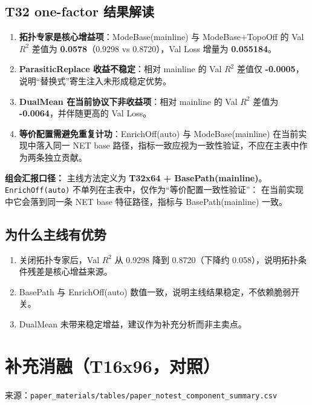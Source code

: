 \documentclass[12pt,a4paper]{ctexart}
\begin{document}
\subsection{T32 one-factor 结果解读}
\begin{enumerate}
  \item \textbf{拓扑专家是核心增益项}：ModeBase(mainline) 与 ModeBase+TopoOff 的 Val $R^2$ 差值为 \textbf{0.0578}（0.9298 vs 0.8720），Val Loss 增量为 \textbf{0.055184}。
  \item \textbf{ParasiticReplace 收益不稳定}：相对 mainline 的 Val $R^2$ 差值仅 \textbf{-0.0005}，说明“替换式”寄生注入未形成稳定优势。
  \item \textbf{DualMean 在当前协议下非收益项}：相对 mainline 的 Val $R^2$ 差值为 \textbf{-0.0064}，并伴随更高的 Val Loss。
  \item \textbf{等价配置需避免重复计功}：EnrichOff(auto) 与 ModeBase(mainline) 在当前实现中落入同一 NET base 路径，指标一致应视为一致性验证，不应在主表中作为两条独立贡献。
\end{enumerate}

\noindent\textbf{组会汇报口径：}
主线方法定义为 \textbf{T32x64 + BasePath(mainline)}。
\texttt{EnrichOff(auto)} 不单列在主表中，仅作为“等价配置一致性验证”：
在当前实现中它会落到同一条 NET base 特征路径，指标与 BasePath(mainline) 一致。

\subsection{为什么主线有优势}
\begin{enumerate}
  \item 关闭拓扑专家后，Val $R^2$ 从 0.9298 降到 0.8720（下降约 0.058），说明拓扑条件残差是核心增益来源。
  \item BasePath 与 EnrichOff(auto) 数值一致，说明主线结果稳定，不依赖脆弱开关。
  \item DualMean 未带来稳定增益，建议作为补充分析而非主卖点。
\end{enumerate}

\section{补充消融（T16x96，对照）}
来源：\texttt{paper\_materials/tables/paper\_notest\_component\_summary.csv}
\end{document}
